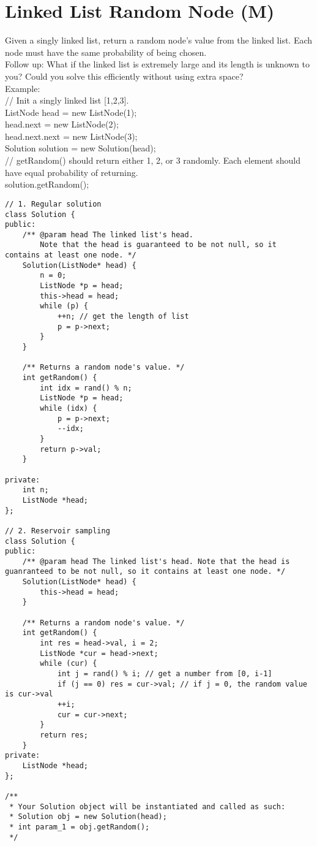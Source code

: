 \section{Linked List Random Node (M)}
Given a singly linked list, return a random node's value from the linked list. Each node must have the same probability of being chosen.\\

Follow up:
What if the linked list is extremely large and its length is unknown to you? Could you solve this efficiently without using extra space?\\

Example:\\

// Init a singly linked list [1,2,3].\\
ListNode head = new ListNode(1);\\
head.next = new ListNode(2);\\
head.next.next = new ListNode(3);\\
Solution solution = new Solution(head);\\

// getRandom() should return either 1, 2, or 3 randomly. Each element should have equal probability of returning.\\
solution.getRandom();\\

\begin{lstlisting}
// 1. Regular solution 
class Solution {
public:
    /** @param head The linked list's head.
        Note that the head is guaranteed to be not null, so it contains at least one node. */
    Solution(ListNode* head) {
        n = 0;
        ListNode *p = head;
        this->head = head;
        while (p) {
            ++n; // get the length of list
            p = p->next;
        }
    }
    
    /** Returns a random node's value. */
    int getRandom() {
        int idx = rand() % n;
        ListNode *p = head;
        while (idx) {
            p = p->next;
            --idx;
        }
        return p->val;
    }
    
private:
    int n;
    ListNode *head;
};

// 2. Reservoir sampling
class Solution {
public:
    /** @param head The linked list's head. Note that the head is guanranteed to be not null, so it contains at least one node. */
    Solution(ListNode* head) {
        this->head = head;
    }
    
    /** Returns a random node's value. */
    int getRandom() {
        int res = head->val, i = 2;
        ListNode *cur = head->next;
        while (cur) {
            int j = rand() % i; // get a number from [0, i-1]
            if (j == 0) res = cur->val; // if j = 0, the random value is cur->val 
            ++i;
            cur = cur->next;
        }
        return res;
    }
private:
    ListNode *head;
};

/**
 * Your Solution object will be instantiated and called as such:
 * Solution obj = new Solution(head);
 * int param_1 = obj.getRandom();
 */
\end{lstlisting}


